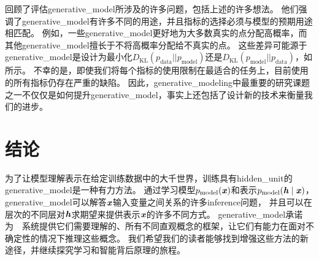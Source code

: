\citet{Theis2015d} 回顾了评估\gls{generative_model}所涉及的许多问题，包括上述的许多想法。
他们强调了\gls{generative_model}有许多不同的用途，并且指标的选择必须与模型的预期用途相匹配。
例如，一些\gls{generative_model}更好地为大多数真实的点分配高概率，而其他\gls{generative_model}擅长于不将高概率分配给不真实的点。
这些差异可能源于\gls{generative_model}是设计为最小化$D_{\text{KL}}(p_{\text{data}} || p_{\text{model}})$还是$D_{\text{KL}}(p_{\text{model}} || p_{\text{data}})$，如所示。
不幸的是，即使我们将每个指标的使用限制在最适合的任务上，目前使用的所有指标仍存在严重的缺陷。
因此，\gls{generative_modeling}中最重要的研究课题之一不仅仅是如何提升\gls{generative_model}，事实上还包括了设计新的技术来衡量我们的进步。


\section{结论}
\label{sec:conclusion}

为了让模型理解表示在给定训练数据中的大千世界，训练具有\gls{hidden_unit}的\gls{generative_model}是一种有力方法。
通过学习模型$p_{\text{model}}(\boldsymbol{\mathit{x}})$和表示$p_{\text{model}}(\boldsymbol{\mathit{h}}  \mid  \boldsymbol{\mathit{x}})$，\gls{generative_model}可以解答$\boldsymbol{\mathit{x}}$输入变量之间关系的许多\gls{inference}问题， 并且可以在层次的不同层对$\boldsymbol{\mathit{h}}$求期望来提供表示$\boldsymbol{\mathit{x}}$的许多不同方式。
\gls{generative_model}承诺为~~系统提供它们需要理解的、所有不同直观概念的框架，让它们有能力在面对不确定性的情况下推理这些概念。
我们希望我们的读者能够找到增强这些方法的新途径，并继续探究学习和智能背后原理的旅程。
